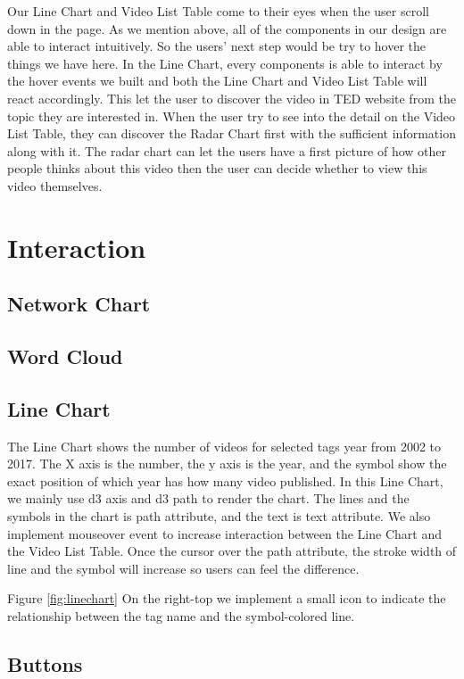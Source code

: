 \documentclass{report}
\numberwithin{figure}{section}
\begin{document}
Our Line Chart and Video List Table come to their eyes when the user scroll down in the page. As we mention above, all of the components in our design are able to interact intuitively. So the users' next step would be try to hover the things we have here. In the Line Chart, every components is able to interact by the hover events we built and both the Line Chart and Video List Table will react accordingly. This let the user to discover the video in TED website from the topic they are interested in. When the user try to see into the detail on the Video List Table, they can discover the Radar Chart first with the sufficient information along with it. The radar chart can let the users have a first picture of how other people thinks about this video then the user can decide whether to view this video themselves.

\section{Interaction}
\subsection{Network Chart}
\subsection{Word Cloud}
\subsection{Line Chart}

\quad The Line Chart shows the number of videos for selected tags year from 2002 to 2017. The X axis is the number, the y axis is the year, and the symbol show the exact position of which year has how many video published. In this Line Chart, we mainly use d3 axis and d3 path to render the chart. The lines and the symbols in the chart is path attribute, and the text is text attribute. We also implement mouseover event to increase interaction between the Line Chart and the Video List Table. Once the cursor over the path attribute, the stroke width of line and the symbol will increase so users can feel the difference.

Figure \ref{fig:linechart} On the right-top we implement a small icon to indicate the relationship between the tag name and the symbol-colored line.

\subsection{Buttons}
\end{document}
